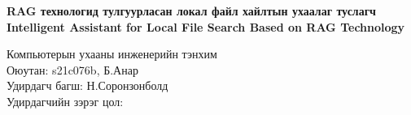 \documentclass[11pt,a4paper]{article}
\begin{document}
\vspace*{-6mm}
\begin{center}
{\fontsize{14pt}{16pt}\selectfont\textbf{RAG технологид тулгуурласан локал файл хайлтын ухаалаг туслагч}\\[1mm]}
{\fontsize{11pt}{13pt}\selectfont\textbf{Intelligent Assistant for Local File Search Based on RAG Technology}}
\end{center}

\begin{flushright}
Компьютерын ухааны инженерийн тэнхим\\
Оюутан: s21c076b, Б.Анар\\
Удирдагч багш: Н.Соронзонболд\\
Удирдагчийн зэрэг цол: \underline{\hspace{3.0cm}}
\end{flushright}
\end{document}
